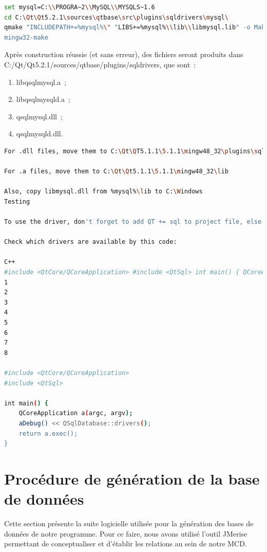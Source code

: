 
\begin{lstlisting}[language=Bash, escapechar=$]
set mysql=C:\\PROGRA~2\\MySQL\\MYSQLS~1.6
cd C:\Qt\Qt5.2.1\sources\qtbase\src\plugins\sqldrivers\mysql\
qmake "INCLUDEPATH+=%mysql%\" "LIBS+=%mysql%\\lib\\libmysql.lib" -o Makefile mysql.pro
mingw32-make
\end{lstlisting}
Après construction réussie (et sans erreur), des fichiers seront produits dans \\ C:/Qt/Qt5.2.1/sources/qtbase/plugins/sqldrivers, que sont~:
\begin{enumerate}
	\item libqsqlmysql.a~;
	\item libqsqlmysqld.a~;
	\item qsqlmysql.dll~;
	\item qsqlmysqld.dll.
\end{enumerate}
\begin{lstlisting}[language=Bash, escapechar=$]
For .dll files, move them to C:\Qt\QT5.1.1\5.1.1\mingw48_32\plugins\sqldrivers.

For .a files, move them to C:\Qt\Qt5.1.1\5.1.1\mingw48_32\lib

Also, copy libmysql.dll from %mysql%\lib to C:\Windows
Testing

To use the driver, don't forget to add QT += sql to project file, else it don't work.

Check which drivers are available by this code:

C++
#include <QtCore/QCoreApplication> #include <QtSql> int main() { QCoreApplication a(argc, argv); aDebug() << QSqlDatabase::drivers(); return a.exec(); }
1
2
3
4
5
6
7
8
	
#include <QtCore/QCoreApplication>
#include <QtSql>
 
int main() {
    QCoreApplication a(argc, argv);
    aDebug() << QSqlDatabase::drivers();
    return a.exec();
}

\end{lstlisting}

 \section{Procédure de génération de la base de données}
 Cette section présente la suite logicielle utilisée pour la génération des bases de données de notre programme. 
 Pour ce faire, nous avons utilisé l'outil JMerise permettant de conceptualiser et d'établir les relations au sein de notre MCD.
 
